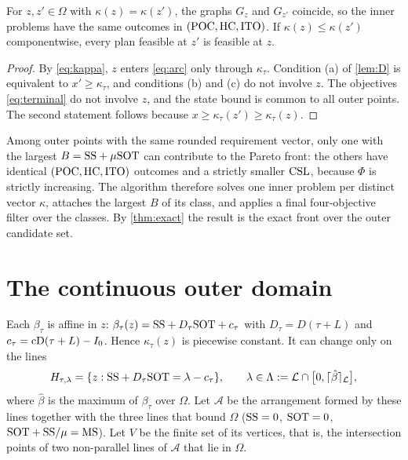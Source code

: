 \begin{lemma}\label{lem:memo}
  For $z,z'\in\Omega$ with $\kappa(z)=\kappa(z')$, the graphs $G_z$ and $G_{z'}$ coincide,
  so the inner problems have the same outcomes in $(\mathrm{POC},\mathrm{HC},\mathrm{ITO})$. If
  $\kappa(z)\le\kappa(z')$ componentwise, every plan feasible at $z'$ is feasible at $z$.
\end{lemma}

\begin{proof}
  By \eqref{eq:kappa}, $z$ enters \eqref{eq:arc} only through $\kappa_\tau$. Condition
  (a) of \cref{lem:D} is equivalent to $x'\ge\kappa_\tau$, and conditions (b) and (c) do
  not involve $z$. The objectives \eqref{eq:terminal} do not involve $z$, and the state
  bound is common to all outer points. The second statement follows because
  $x\ge\kappa_\tau(z')\ge\kappa_\tau(z)$.
\end{proof}

\begin{corollary}\label{cor:memo}
  Among outer points with the same rounded requirement vector, only one with the largest
  $B=\mathrm{SS}+\mu\mathrm{SOT}$ can contribute to the Pareto front: the others have identical
  $(\mathrm{POC},\mathrm{HC},\mathrm{ITO})$ outcomes and a strictly smaller $\mathrm{CSL}$, because $\Phi$ is strictly
  increasing. The algorithm therefore solves one inner problem per distinct vector
  $\kappa$, attaches the largest $B$ of its class, and applies a final four-objective
  filter over the classes. By \cref{thm:exact} the result is the exact front over the
  outer candidate set.
\end{corollary}

\section{The continuous outer domain}\label{sec:continuous}

Each $\beta_\tau$ is affine in $z$: $\beta_\tau(z)=\mathrm{SS}+D_\tau\mathrm{SOT}+c_\tau$ with
$D_\tau=D(\tau+L)$ and $c_\tau=\mathrm{cD}(\tau+L)-I_0$. Hence $\kappa_\tau(z)$ is piecewise
constant. It can change only on the lines
\begin{equation}
  H_{\tau,\lambda}=\{z : \mathrm{SS}+D_\tau\mathrm{SOT}=\lambda-c_\tau\},\qquad
  \lambda\in\Lambda:=\mathcal{L}\cap\bigl[0,\lceil \hat\beta\rceil_{\mathcal{L}}\bigr],
\end{equation}
where $\hat\beta$ is the maximum of $\beta_\tau$ over $\Omega$. Let $\mathcal{A}$ be the
arrangement formed by these lines together with the three lines that bound $\Omega$
($\mathrm{SS}=0$, $\mathrm{SOT}=0$, $\mathrm{SOT}+\mathrm{SS}/\mu=\mathrm{MS}$). Let $V$ be the finite set of its vertices,
that is, the intersection points of two non-parallel lines of $\mathcal{A}$ that lie in
$\Omega$.

